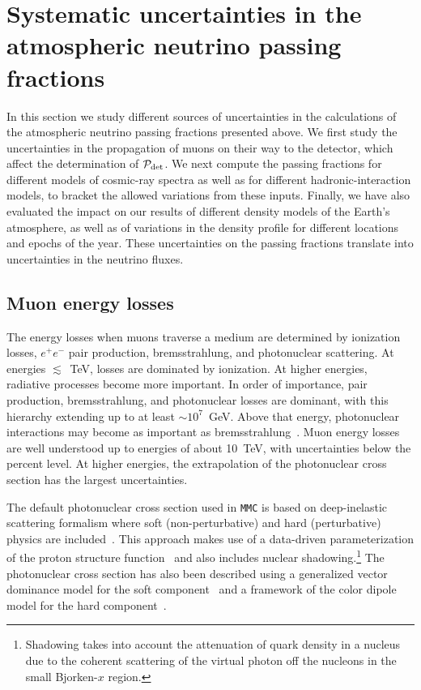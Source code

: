 \documentclass[aps,prd,showpacs,letterpaper,onecolumn,longbibliography,superscriptaddress,notitlepage,nofootinbib]{revtex4-1}%
\newcommand{\Prob}{{\cal P}}
\newcommand{\MMC}{\texttt{MMC}}
\begin{document}
\section{Systematic uncertainties in the atmospheric neutrino passing fractions}
\label{sec:systematics}

In this section we study different sources of uncertainties in the calculations of the atmospheric neutrino passing fractions presented above. We first study the uncertainties in the propagation of muons on their way to the detector, which affect the determination of $\Prob_{\rm det}$. We next compute the passing fractions for different models of cosmic-ray spectra as well as for different hadronic-interaction models, to bracket the allowed variations from these inputs. Finally, we have also evaluated the impact on our results of different density models of the Earth's atmosphere, as well as of variations in the density profile for different locations and epochs of the year. These uncertainties on the passing fractions translate into uncertainties in the neutrino fluxes.

\subsection{Muon energy losses}
\label{sec:muonlosses}

The energy losses when muons traverse a medium are determined by ionization losses, $e^+ e^-$ pair production, bremsstrahlung, and photonuclear scattering. At energies $\lesssim$~TeV, losses are dominated by ionization. At higher energies, radiative processes become more important. In order of importance, pair production, bremsstrahlung, and photonuclear losses are dominant, with this hierarchy extending up to at least $\sim 10^7$~GeV. Above that energy, photonuclear interactions may become as important as bremsstrahlung~\cite{Chirkin:2004hz}. Muon energy losses are well understood up to energies of about 10~TeV, with uncertainties below the percent level. At higher energies, the extrapolation of the photonuclear cross section has the largest uncertainties.

The default photonuclear cross section used in \MMC{} is based on deep-inelastic scattering formalism where soft (non-perturbative) and hard (perturbative) physics are included~\cite{Dutta:2000hh}. This approach makes use of a data-driven parameterization of the proton structure function~\cite{Abramowicz:1991xz, Abramowicz:1997ms} and also includes nuclear shadowing.\footnote{Shadowing takes into account the attenuation of quark density in a nucleus due to the coherent scattering of the virtual photon off the nucleons in the small Bjorken-$x$ region.} The photonuclear cross section has also been described using a generalized vector dominance model for the soft component~\cite{Bezrukov:1981ci} and a framework of the color dipole model for the hard component~\cite{Bugaev:2002gy, Bugaev:2003sw}.
\end{document}
